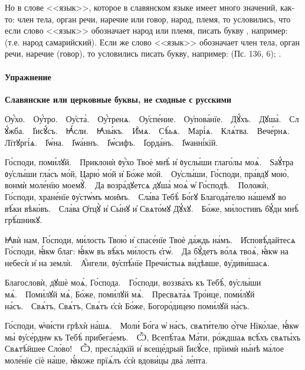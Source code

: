\documentclass[11pt,a4paper,oneside]{memoir}
\begin{document}
    Но в слове <<язык>>, которое в славянском языке имеет много значений, как-то: член тела, орган речи, наречие или говор, народ, племя, то условились, что если слово <<язык>> обозначает народ или племя, писать букву {}, например: {} (т.е. народ самарийский). Если же слово <<язык>> обозначает член тела, орган речи, наречие (говор), то условились писать букву{}, например: {} (Пс. 136, 6); {}.
    
                    \paragraph{Упражнение}

    \textbf{Славянские или церковные буквы, не сходные с русскими}
    \medskip
    
    \begin{slv}
        Оу҆́хо.~\textemdash~Оу҆́тро.~\textemdash~Оу҆ста̀.~\textemdash~Оу҆́тренѧ.~\textemdash~Оу҆спе́ние.~\textemdash~Оу҆пова́нїе.~\textemdash~Дꙋ́хъ.~\textemdash~Дꙋша̀.~\textemdash~Слꙋ́жба.~\textemdash~І҆исꙋ́съ.~\textemdash~Ꙗ҆́сли.~\textemdash~Ꙗ҆зы́къ.~\textemdash~И҆́мѧ.~\textemdash~Сѣ́ьѧ.~\textemdash~Марі́ѧ.~\textemdash~Клѧ́тва.~\textemdash~Вече́рнѧ.~\textemdash~Лїтꙋргі́ѧ.~\textemdash~І҆ѡ́на.~\textemdash~І҆ѡа́ннъ.~\textemdash~І҆ѡ́сифъ.~\textemdash~І҆ѻрда́нъ.~\textemdash~І҆ѡанні́кїй.
        
        Го́споди, поми́лꙋй.~\textemdash~Приклонѝ ᲂу҆́хо Твоѐ мнѣ̀ и҆ ᲂуслы́ши глаго́лы моѧ̀.~\textemdash~Ѕаꙋ́тра ᲂу҆слы́ши гла́съ мо́й, Царю̀ мо́й и҆ Бо́же мо́й.~\textemdash~Оу҆слы́ши, Го́споди, пра́вдꙋ мою̀, вонмѝ моле́нїю моемꙋ̀.~\textemdash~Да возра́дꙋетсѧ дꙋша̀ моѧ̀ ѡ҆ Го́сподѣ.~\textemdash~Положѝ, Го́споди, хране́нїе ᲂу҆стѡ́мъ мои̑мъ.~\textemdash~Сла́ва Тебѣ̀ Бо́гꙋ Благода́телю на́шемꙋ во вѣ́ки вѣко́въ.~\textemdash~Сла́ва Ѻ҆тцꙋ̀ и҆ Сы́нꙋ и҆ Свѧто́мꙋ Дꙋ́хꙋ.~\textemdash~Бо́же, ми́лостивъ бꙋ́ди мнѣ̀ грѣ́шникꙋ.
        
        Ꙗ҆вѝ нам, Го́споди, ми́лость Твою̀ и҆ спасе́нїе Твоѐ да́ждь на́мъ.~\textemdash~И҆сповѣ́дайтесѧ Го́споди, ꙗ҆́кѡ благ: ꙗ҆́кѡ въ вѣ́къ ми́лость є҆гѡ́.~\textemdash~Да бꙋ́детъ во́лѧ твоѧ̀, ꙗ҆́кѡ на небесѝ и҆ на землѝ.~\textemdash~А҆́нгели, ᲂу҆спѣ́нїе Пречи́стыѧ ви́дѣвше, ᲂу҆диви́шасѧ.
        
        Благословѝ, дꙋшѐ моѧ̀, Го́спода.~\textemdash~Го́споди, воззва́хъ къ Тебѣ̀, ᲂу҆слы́ши мѧ̀.~\textemdash~Поми́лꙋй мѧ̀, Бо́же, поми́лꙋй мѧ̀.~\textemdash~Пресвѧта́ѧ Тро́ице, поми́лꙋй на́съ.~\textemdash~Свѧ́тъ, Свѧ́тъ, Свѧ́тъ є҆сѝ Бо́же, Богоро́дицею поми́лꙋй на́съ.
        
        Го́споди, ѡ҆чи́сти грѣхѝ на́шѧ.~\textemdash~Моли́ Бо́га ѡ҆ на́съ, свѧти́телю ѻ҆́тче Нїко́лае, ꙗ҆́кѡ мы̀ ᲂу҆се́рднѡ къ Тебѣ̀ прибега́емъ.~\textemdash~Ѽ, Всепѣ́таѧ Ма́ти, ро́ждшаѧ всѣ́хъ свѧты́хъ Свѧтѣ́йшее Сло́во!~\textemdash~Ѽ, пресла́дкїй и҆ всеще́дрый І҆исꙋ́се, прїимѝ ны́нѣ ма́лое моле́нїе сїѐ на́ше, ꙗ҆́коже прїѧ́лъ є҆сѝ вдови́цы два̀ ле́пта.
    \end{slv}
\end{document}
